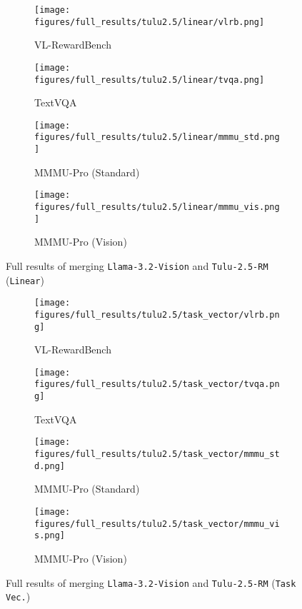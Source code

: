 \begin{figure*}[ht]
     \centering
     \begin{subfigure}[b]{0.245\linewidth}
         \centering
         \texttt{[image: figures/full\_results/tulu2.5/linear/vlrb.png]}
         \caption{VL-RewardBench}
     \end{subfigure}
     \hfill
     \begin{subfigure}[b]{0.245\linewidth}
         \centering
         \texttt{[image: figures/full\_results/tulu2.5/linear/tvqa.png]}
         \caption{TextVQA}
     \end{subfigure}
     \hfill
      \begin{subfigure}[b]{0.245\linewidth}
         \centering
         \texttt{[image: figures/full\_results/tulu2.5/linear/mmmu\_std.png]}
         \caption{MMMU-Pro (Standard)}
     \end{subfigure}
     \hfill
     \begin{subfigure}[b]{0.245\linewidth}
         \centering
         \texttt{[image: figures/full\_results/tulu2.5/linear/mmmu\_vis.png]}
         \caption{MMMU-Pro (Vision)}
     \end{subfigure}
        \caption{Full results of merging \texttt{Llama-3.2-Vision} and \texttt{Tulu-2.5-RM} (\texttt{Linear})}
        \vspace{-10pt}
        \label{fig:full_tulu2.5_linear}
\end{figure*}

\begin{figure*}[ht]
     \centering
     \begin{subfigure}[b]{0.245\linewidth}
         \centering
         \texttt{[image: figures/full\_results/tulu2.5/task\_vector/vlrb.png]}
         \caption{VL-RewardBench}
     \end{subfigure}
     \hfill
     \begin{subfigure}[b]{0.245\linewidth}
         \centering
         \texttt{[image: figures/full\_results/tulu2.5/task\_vector/tvqa.png]}
         \caption{TextVQA}
     \end{subfigure}
     \hfill
      \begin{subfigure}[b]{0.245\linewidth}
         \centering
         \texttt{[image: figures/full\_results/tulu2.5/task\_vector/mmmu\_std.png]}
         \caption{MMMU-Pro (Standard)}
     \end{subfigure}
     \hfill
     \begin{subfigure}[b]{0.245\linewidth}
         \centering
         \texttt{[image: figures/full\_results/tulu2.5/task\_vector/mmmu\_vis.png]}
         \caption{MMMU-Pro (Vision)}
     \end{subfigure}
        \caption{Full results of merging \texttt{Llama-3.2-Vision} and \texttt{Tulu-2.5-RM} (\texttt{Task Vec.})}
        \vspace{-10pt}
        \label{fig:full_tulu2.5_task_vector}
\end{figure*}

